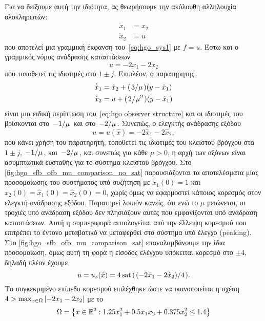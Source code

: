 Για να δείξουμε αυτή την ιδιότητα, ας θεωρήσουμε την ακόλουθη αλληλουχία ολοκληρωτών:
\begin{align*}
    \dot x_1 &= x_2\\
    \dot x_2 &= u
\end{align*}
που αποτελεί μια γραμμική έκφανση του~\eqref{eq:hgo_sys1} με $f = u$. Έστω και ο γραμμικός νόμος ανάδρασης καταστάσεων
\[
    u = -2x_1 -2 x_2
\]
που τοποθετεί τις ιδιοτιμές στο $1 \pm j$. Επιπλέον, ο παρατηρητης
\begin{align*}
    \dot {\hat x}_1 &= \hat x_2 + (\flatfrac{3}{\mu}) (y - \hat x_1)\\
    \dot {\hat x}_2 &= u +  (\flatfrac{2}{\mu^2}) (y - \hat x_1)
\end{align*}
είναι μια ειδική περίπτωση του~\eqref{eq:hgo observer structure} και οι ιδιοτιμές του βρίσκονται στο $\flatfrac{-1}{\mu}$ και στο $\flatfrac{-2}{\mu}$. Συνεπώς, ο ελεγκτής ανάδρασης εξόδου 
\begin{equation}
    \label{eq:hgo ofb control w/o sat}
    u = u(\hat x) = - 2 \hat{x}_1 - 2 \hat x_2,
\end{equation}
που κάνει χρήση του παρατηρητή, τοποθετεί τις ιδιοτιμές του κλειστού βρόγχου στα $1 \pm j$, $\flatfrac{-1}{\mu}$, και $\flatfrac{-2}{\mu}$, και συνεπώς για κάθε $\mu > 0$, η αρχή των αξόνων είναι ασυμπτωτικά ευσταθής για το σύστημα κλειστού βρόγχου. Στο \cref{fig:hgo_sfb_ofb_mu_comparison_no_sat} παρουσιάζονται τα αποτελέσματα μίας προσομοίωσης του συστήματος υπό συζήτηση με $x_1(0) = 1$ και $x_2(0) = \hat x_1(0) = \hat x_2(0) = 0$, χωρίς όμως να εφαρμοστεί κάποιος κορεσμός στον ελεγκτή ανάδρασης εξόδου. Παρατηρεί λοιπόν κανείς, ότι ενώ το $\mu$ μειώνεται, οι τροχιές υπό ανάδραση εξόδου δεν πλησιάζουν αυτές που εμφανίζονται υπό ανάδραση καταστάσεων. Αυτή η συμπεριφορά αιτιολογείται από την έλλειψη κορεσμού που επιτρέπει το έντονο μεταβατικό να μεταφερθεί στο σύστημα υπό έλεγχο (\textlatin{peaking}). Στο \cref{fig:hgo_sfb_ofb_mu_comparison_sat} επαναλαμβάνουμε την ίδια προσομοίωση, όμως αυτή τη φορά η είσοδος ελέγχου υπόκειται κορεσμό στο $\pm 4$, δηλαδή πλέον έχουμε 
\begin{equation}
    \label{eq:hgo ofb control w/ sat}
    u = u_s(\hat x) = 4 \sat\pqty{\flatfrac{\pqty{- 2 \hat{x}_1 - 2 \hat x_2}}{4}}.
\end{equation}
Το συγκεκριμένο επίπεδο κορεσμού επιλέχθηκε ώστε να ικανοποιείται η σχέση $4 > \max_{x \in\Omega} \abs{-2x_1 -2x_2}$ με το 
\[
    \Omega = \qty{x \in \mathbb{R}^2: 1.25 x_1^2 + 0.5 x_1 x_2 + 0.375x_2^2 \leq 1.4}
\]
